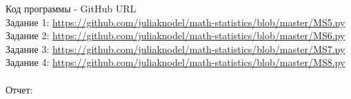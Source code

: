 Код программы - GitHub URL  \\
Задание 1: \url{https://github.com/juliaknodel/math-statistics/blob/master/MS5.py}\\
Задание 2: \url{https://github.com/juliaknodel/math-statistics/blob/master/MS6.py}\\
Задание 3: \url{https://github.com/juliaknodel/math-statistics/blob/master/MS7.py}\\
Задание 4: \url{https://github.com/juliaknodel/math-statistics/blob/master/MS8.py}\\
\\
Отчет: